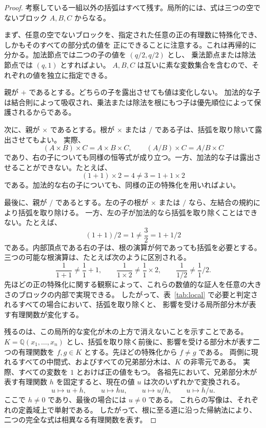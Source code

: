 \documentclass[11pt]{ltjsarticle}
\newcommand{\Q}{\mathbb{Q}}
\begin{document}
\begin{proof}
考察している一組以外の括弧はすべて残す。局所的には、式は三つの空でないブロック $A,B,C$ からなる。

まず、任意の空でないブロックを、指定された任意の正の有理数に特殊化でき、しかもそのすべての部分式の値を
正にできることに注意する。これは再帰的に分かる。加法節点では二つの子の値を $(q/2,q/2)$ とし、
乗法節点または除法節点では $(q,1)$ とすればよい。
$A,B,C$ は互いに素な変数集合を含むので、それぞれの値を独立に指定できる。

親が $+$ であるとする。どちらの子を露出させても値は変化しない。
加法的な子は結合則によって吸収され、乗法または除法を根にもつ子は優先順位によって保護されるからである。

次に、親が $\times$ であるとする。根が $\times$ または $/$ である子は、括弧を取り除いて露出させてもよい。
実際、
\[
 (A\times B)\times C=A\times B\times C,
 \qquad
 (A/B)\times C=A/B\times C
\]
であり、右の子についても同様の恒等式が成り立つ。一方、加法的な子は露出させることができない。たとえば、
\[
 (1+1)\times2=4\ne3=1+1\times2
\]
である。加法的な右の子についても、同様の正の特殊化を用いればよい。

最後に、親が $/$ であるとする。左の子の根が $\times$ または $/$ なら、左結合の規約により括弧を取り除ける。
一方、左の子が加法的なら括弧を取り除くことはできない。たとえば、
\[
 (1+1)/2=1\ne\frac32=1+1/2
\]
である。内部頂点である右の子は、根の演算が何であっても括弧を必要とする。
三つの可能な根演算は、たとえば次のように区別される。
\[
 \frac{1}{1+1}\ne \frac11+1,
 \qquad
 \frac{1}{1\times2}\ne \frac11\times2,
 \qquad
 \frac{1}{1/2}\ne \frac11/2.
\]
先ほどの正の特殊化に関する観察によって、これらの数値的な証人を任意の大きさのブロックの内部で実現できる。
したがって、表~\ref{tab:local} で必要と判定されるすべての場合において、括弧を取り除くと、
影響を受ける局所部分木が表す有理関数が変化する。

残るのは、この局所的な変化が木の上方で消えないことを示すことである。
$K=\Q(x_1,\ldots,x_n)$ とし、括弧を取り除く前後に、影響を受ける部分木が表す二つの有理関数を
$f,g\in K$ とする。先ほどの特殊化から $f\ne g$ である。
両側に現れるすべての中間式、およびすべての兄弟部分木は、$K$ の非零元である。
実際、すべての変数を $1$ とおけば正の値をもつ。
各祖先において、兄弟部分木が表す有理関数 $h$ を固定すると、現在の値 $u$ は次のいずれかで変換される。
\[
 u\longmapsto u+h,
 \qquad
 u\longmapsto hu,
 \qquad
 u\longmapsto u/h,
 \qquad
 u\longmapsto h/u.
\]
ここで $h\ne0$ であり、最後の場合には $u\ne0$ である。
これらの写像は、それぞれの定義域上で単射である。
したがって、根に至る道に沿った帰納法により、二つの完全な式は相異なる有理関数を表す。
\end{proof}
\end{document}
